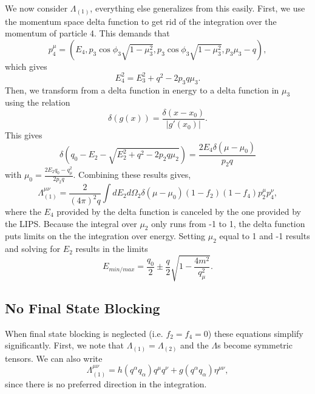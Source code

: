 \documentclass[12pt,letter]{article}
\begin{document}
We now consider $\Lambda_{(1)}$, everything else generalizes from this easily.  
First, we use the momentum space delta function to get rid of the integration over the momentum of particle 4.  This demands that  
\begin{equation*}
p_4^\mu = \left(E_4, p_3 \cos \phi_3 \sqrt{1-\mu_3^2}, 
p_3 \cos \phi_3 \sqrt{1-\mu_3^2}, p_3 \mu_3 - q\right),  
\end{equation*}
which gives 
\begin{equation*}
E_4^2 = E_3^2 + q^2 - 2 p_3 q \mu_3.
\end{equation*}
Then, we transform from a delta function in energy to a delta function in $\mu_3$ using the relation
\begin{equation*}
\delta(g(x)) = \frac{\delta(x-x_0)}{|g'(x_0)|}.
\end{equation*} 
This gives 
\begin{equation*}
\delta\left(q_0 - E_2 - \sqrt{E_2^2 + q^2 - 2 p_2 q \mu_2}\right) 
= \frac{2 E_4 \delta(\mu - \mu_0)}{p_2 q}    
\end{equation*}
with $\mu_0 = \frac{2 E_2 q_0 - q_\mu^2}{2 p_2 q}$.  Combining these results gives,
\begin{equation*}
\Lambda_{(1)}^{\mu \nu} = \frac{2}{(4 \pi)^2 q}\int dE_2 d\Omega_2 
\delta(\mu-\mu_0) (1-f_2)(1-f_4)p^\mu_2 p^\nu_4,
\end{equation*}
where the $E_4$ provided by the delta function is canceled by the one provided by the LIPS.  Because the integral over $\mu_2$ only runs from -1 to 1, the delta function puts limits on the the integration over energy.  Setting $\mu_2$ equal to 1 and -1 results and solving for $E_2$ results in the limits 
\begin{equation*}
E_{min/max} = \frac{q_0}{2} \pm \frac{q}{2} \sqrt{1 - \frac{4 m^2}{q_\mu^2}}.
\end{equation*} 

\subsection{No Final State Blocking}
When final state blocking is neglected (i.e. $f_2 = f_4 = 0$) these equations simplify significantly.  First, we note that $\Lambda_{(1)} = \Lambda_{(2)}$ and the $\Lambda$s become symmetric tensors.  We can also write 
\begin{equation*}
\Lambda_{(1)}^{\mu \nu} = 
h(q^\alpha q_\alpha) q^\mu q^\nu + g(q^\alpha q_\alpha) \eta^{\mu \nu},
\end{equation*}
since there is no preferred direction in the integration.  
\end{document}
